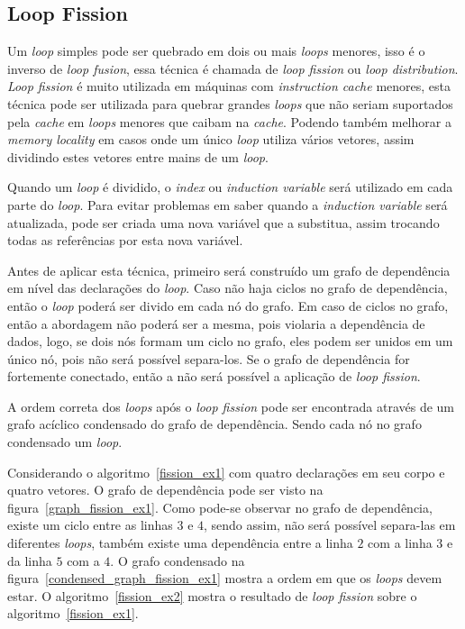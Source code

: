 
\subsection{Loop Fission}

Um \textit{loop} simples pode ser quebrado em dois ou mais \textit{loops}
menores, isso é o inverso de \textit{loop fusion}, essa técnica é chamada de
\textit{loop fission} ou \textit{loop distribution}.
\textit{Loop fission} é muito utilizada em máquinas com 
\textit{instruction cache} menores, esta técnica pode ser utilizada para quebrar
grandes \textit{loops} que não seriam suportados pela \textit{cache} em
\textit{loops} menores que caibam na \textit{cache}.
Podendo também melhorar a \textit{memory locality} em casos onde um único
\textit{loop} utiliza vários vetores, assim dividindo estes vetores entre mains 
de um \textit{loop}.

Quando um \textit{loop} é dividido, o \textit{index} ou \textit{induction
variable} será utilizado em cada parte do \textit{loop}. 
Para evitar problemas em saber quando a \textit{induction variable} será
atualizada, pode ser criada uma nova variável que a substitua, assim trocando
todas as referências por esta nova variável.

Antes de aplicar esta técnica, primeiro será construído um grafo de dependência em
nível das declarações do \textit{loop}. 
Caso não haja ciclos no grafo de dependência, então o \textit{loop} poderá ser
divido em cada nó do grafo. 
Em caso de ciclos no grafo, então a abordagem não poderá ser a mesma, pois
violaria a dependência de dados, logo, se dois nós formam um ciclo no grafo,
eles podem ser unidos em um único nó, pois não será possível separa-los.
Se o grafo de dependência for fortemente conectado, então a não será possível a
aplicação de \textit{loop fission}.

A ordem correta dos \textit{loops} após o \textit{loop fission} pode ser
encontrada através de um grafo acíclico condensado do grafo de dependência.
Sendo cada nó no grafo condensado um \textit{loop}.

Considerando o algoritmo~\ref{fission_ex1} com quatro declarações em seu corpo e
quatro vetores. 
O grafo de dependência pode ser visto na figura~\ref{graph_fission_ex1}. 
Como pode-se observar no grafo de dependência, existe um ciclo entre as linhas
$3$ e $4$, sendo assim, não será possível separa-las em diferentes
\textit{loops}, também existe uma dependência entre a linha $2$ com a linha $3$
e da linha $5$ com a $4$.
O grafo condensado na figura~\ref{condensed_graph_fission_ex1} mostra a
ordem em que os \textit{loops} devem estar.
O algoritmo~\ref{fission_ex2} mostra o resultado de \textit{loop fission} sobre
o algoritmo~\ref{fission_ex1}.

